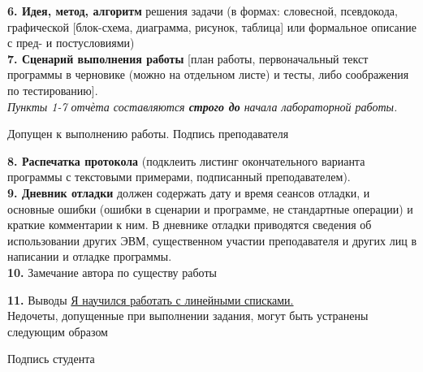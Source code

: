 \documentclass[10pt]{report}
\begin{document}
    \begin{spacing}{1}
        \indent \textbf{6. Идея, метод, алгоритм} решения задачи (в формах: словесной, псевдокода, графической [блок-схема, диаграмма, рисунок, таблица] или формальное описание с пред- и постусловиями)\\
        
    
        \indent \textbf{7. Сценарий выполнения работы} [план работы, первоначальный текст программы в черновике (можно на отдельном листе) и тесты, либо соображения по тестированию].\\
        
        \textit{Пункты 1-7 отчѐта составляются \textbf{строго до} начала лабораторной работы.}\\
        \begin{flushright}
            Допущен к выполнению работы. Подпись преподавателя \underline{\hspace{1.5in}}\\
        \end{flushright}
    
        \indent \textbf{8. Распечатка протокола} (подклеить листинг окончательного варианта программы с текстовыми
        примерами, подписанный преподавателем).\\
        
    
        \indent \textbf{9. Дневник отладки} должен содержать дату и время сеансов отладки, и основные ошибки (ошибки в
        сценарии и программе, не стандартные операции) и краткие комментарии к ним. В дневнике отладки
        приводятся сведения об использовании других ЭВМ, существенном участии преподавателя и других
        лиц в написании и отладке программы.\\
        
        
        \indent \textbf{10.} Замечание автора по существу работы \underline{\hspace{3.5in}}\\
        \underline{\hspace{5.5in}}
        
        \indent \textbf{11.} Выводы \underline{\hspace{0.5in}Я научился работать с линейными списками.\hspace{0.5in}}\\


        Недочеты, допущенные при выполнении задания, могут быть устранены следующим образом \underline{\hspace{0.5in}}\\
        \underline{\hspace{5.5in}}

        \begin{flushright}
            Подпись студента \underline{\hspace{1.5in}}\\
        \end{flushright}

    \end{spacing}
    
   
    
    
\end{document}
